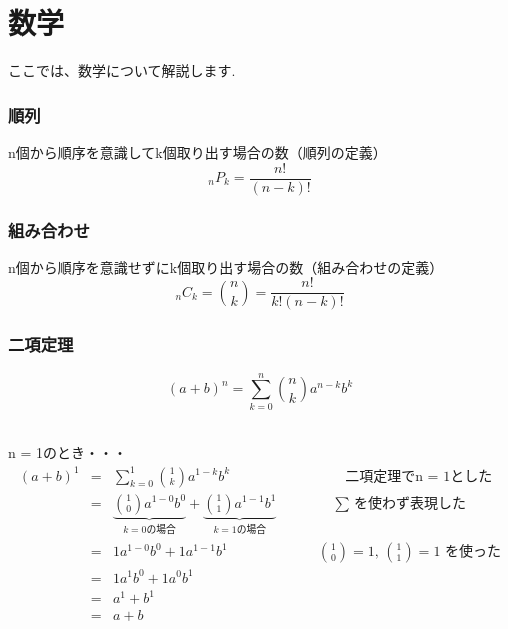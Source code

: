 \documentclass[fleqn,leqno,autodetect-engine,dvipdfmx-if-dvi,ja=standard]{bxjsarticle}
\begin{document}
\newpage

\part{数学}
ここでは、数学について解説します.

\setcounter{section}{0}
\section{順列}

n個から順序を意識してk個取り出す場合の数（順列の定義）
\[ {}_n P _k  =  \frac{n!}{(n-k)!} \]

\section{組み合わせ}

n個から順序を意識せずにk個取り出す場合の数（組み合わせの定義）
\[ {}_n C _k = \binom nk = \frac{n!}{k!(n-k)!}  
\]

\section{二項定理}

\[
 (a + b)^n = \sum_{k=0}^n \binom nk a^{n-k} b^k
\]

\ \\
n = 1のとき・・・
\begin{eqnarray*}
 (a + b)^1 &=& \sum_{k=0}^1 \binom 1k a^{1-k} b^k \qquad \qquad \qquad \qquad \ \text{二項定理でn = 1とした}\\
  &=& \underbrace{ 
        \binom 10 a^{1-0} b^0
        }_{k = 0の場合}
        +
        \underbrace{
        \binom 11 a^{1-1} b^1
        }_{k = 1の場合} \qquad \qquad \text{$\sum$ を使わず表現した}\\
  &=& 1a^{1-0} b^0 + 1a^{1-1} b^1 \qquad \qquad \qquad \ \ \text{$\binom {1}{0} = 1$,                                                                     
                                                                    $\binom {1}{1} = 1$ を使った}\\
  &=& 1a^1b^0 + 1a^0b^1\\
  &=& a^1 + b^1\\
  &=& a + b
\end{eqnarray*}
\end{document}
